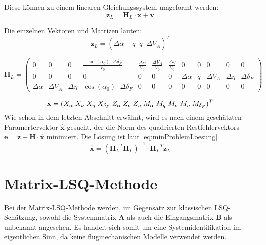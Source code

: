Diese können zu einem linearen Gleichungssystem umgeformt werden: 
\begin{equation}
    \mathbf{z}_{L}= \mathbf{H}_{L}\cdot \mathbf{x} + \mathbf{v}
\end{equation}

Die einzelnen Vektoren und Matrizen lauten:
\setcounter{MaxMatrixCols}{15}
\begin{equation}
	\mathbf{z}_{L} = (\Delta\dot \alpha-q \;\; \dot q \;\; \Delta\dot V_A)^T
\end{equation}

\begin{equation}
	 \mathbf{H}_{L} = \begin{pmatrix}
		0&0&0& \frac{-\sin{(\alpha_0)}\cdot\Delta\delta_F}{V_0} & \frac{\Delta\alpha}{V_0}& \frac{\Delta V_A}{V_0} & 
		\frac{\Delta\eta}{V_0} &0&0&0&0&0   \\
		0&0&0&0&0&0&0 &\Delta\alpha & q & \Delta V_A & \Delta\eta & \Delta\delta_F \\
		\Delta\alpha &  \Delta V_A & \Delta\eta & \cos{(\alpha_0)}\cdot\Delta\delta_F &0&0&0&0&0&0&0&0 
	\end{pmatrix}
\end{equation}

\begin{equation}
	\mathbf{x} = (X_{\alpha}\; 
	X_{\nu}\;
	X_{\eta}\;
	X_{\delta_F}\; 
	Z_{\alpha}\; 
	Z_{\nu}\;
	Z_{\eta}\;
	M_{\alpha}\;
	M_{q}\;
	M_{\nu}\;
	M_{\eta}\;
	M_{\delta_F})^T \\
\end{equation}  
Wie schon in dem letzten Abschnitt erwähnt, wird es nach einem geschätzten Paramertervektor $\mathbf{\hat{x}}$ gesucht, der 
die Norm des quadrierten Restfehlervektors $ \mathbf{e} = \mathbf{z} - \mathbf{H}\cdot \mathbf{\hat{x}}$ minimiert. Die 
Lösung ist laut \cref{eq:minProblemLoesung}
\begin{equation}
    \hat{\mathbf{x}}= {({\mathbf{H}_L}^{T} {\mathbf{H}_L})}^{-1} \cdot {\mathbf{H}_L}^{T} \mathbf{z}_L 
\end{equation}



\section{Matrix-LSQ-Methode}

Bei der Matrix-LSQ-Methode werden, im Gegensatz zur klassischen LSQ-Schätzung, sowohl die Systemmatrix $ \mathbf{A} $ als 
auch die Eingangsmatrix $ \mathbf{B} $ als unbekannt angesehen. Es handelt sich somit um eine Systemidentifikation im 
eigentlichen Sinn, da keine flugmechanischen Modelle verwendet werden.

